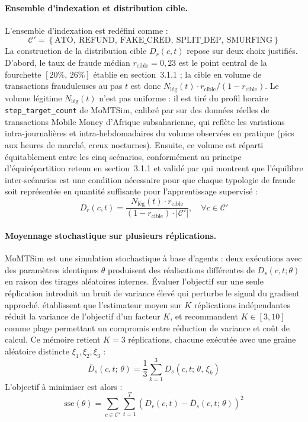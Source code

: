 \documentclass[11pt,a4paper,oneside]{report}
\theoremstyle{definition}
\theoremstyle{remark}
\begin{document}
\paragraph{Ensemble d'indexation et distribution cible.}
L'ensemble d'indexation est redéfini comme :
\begin{equation}
    \mathcal{C}' = \left\{\text{ATO},\ \text{REFUND},\ \text{FAKE\_CRED},\ \text{SPLIT\_DEP},\ \text{SMURFING}\right\}
\end{equation}
La construction de la distribution cible $D_r(c, t)$ repose sur deux choix justifiés. D'abord, le taux de fraude médian $r_\text{cible} = 0{,}23$ est le point central de la fourchette $[20\%,\, 26\%]$ établie en section~3.1.1 ; la cible en volume de transactions frauduleuses au pas $t$ est donc $N_\text{lég}(t) \cdot r_\text{cible} / (1 - r_\text{cible})$. Le volume légitime $N_\text{lég}(t)$ n'est pas uniforme : il est tiré du profil horaire \texttt{step\_target\_count} de MoMTSim, calibré par \citet{azamuke2024momtsim} sur des données réelles de transactions Mobile Money d'Afrique subsaharienne, qui reflète les variations intra-journalières et intra-hebdomadaires du volume observées en pratique (pics aux heures de marché, creux nocturnes). Ensuite, ce volume est réparti équitablement entre les cinq scénarios, conformément au principe d'équirépartition retenu en section~3.1.1 et validé par \citet{azamuke2022scenario} qui montrent que l'équilibre inter-scénarios est une condition nécessaire pour que chaque typologie de fraude soit représentée en quantité suffisante pour l'apprentissage supervisé :
\begin{equation}
    D_r(c, t) = \frac{N_\text{lég}(t) \cdot r_\text{cible}}{(1 - r_\text{cible}) \cdot |\mathcal{C}'|}, \quad \forall c \in \mathcal{C}'
\end{equation}

\paragraph{Moyennage stochastique sur plusieurs réplications.}
MoMTSim est une simulation stochastique à base d'agents : deux exécutions avec des paramètres identiques $\theta$ produisent des réalisations différentes de $D_s(c,t;\theta)$ en raison des tirages aléatoires internes. Évaluer l'objectif sur une seule réplication introduit un bruit de variance élevé qui perturbe le signal du gradient approché. \citet{law2000simulation} établissent que l'estimateur moyen sur $K$ réplications indépendantes réduit la variance de l'objectif d'un facteur $K$, et recommandent $K \in [3, 10]$ comme plage permettant un compromis entre réduction de variance et coût de calcul. Ce mémoire retient $K = 3$ réplications, chacune exécutée avec une graine aléatoire distincte $\xi_1, \xi_2, \xi_3$ :
\begin{equation}
    \bar{D}_s(c, t;\, \theta) = \frac{1}{3} \sum_{k=1}^{3} D_s(c, t;\, \theta,\, \xi_k)
\end{equation}
L'objectif à minimiser est alors :
\begin{equation}
    \text{sse}(\theta) = \sum_{c \in \mathcal{C}'} \sum_{t=1}^{T} \left(D_r(c, t) - \bar{D}_s(c, t;\, \theta)\right)^2
\end{equation}
\end{document}
